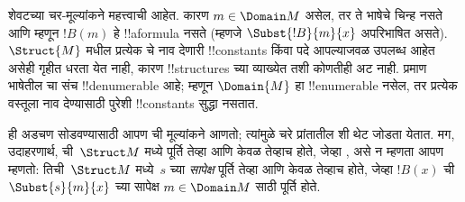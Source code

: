 \documentclass[../../../include/open-logic-section]{subfiles}
\begin{document}
\begin{explain}
शेवटच्या 
चर-मूल्यांकने महत्त्वाची आहेत.
कारण $m \in \Domain M$ असेल, तर ते भाषेचे चिन्ह नसते आणि म्हणून
$!B(m)$ हे !!a{formula} नसते (म्हणजे $\Subst{!B}{m}{x}$ अपरिभाषित
असते).~$\Struct{M}$ मधील प्रत्येक चे नाव देणारी
!!{constant}s किंवा पदे
आपल्याजवळ उपलब्ध आहेत असेही गृहीत धरता येत नाही, कारण !!{structure}s
च्या व्याख्येत तशी कोणतीही अट नाही. प्रमाण भाषेतील चा
संच !!{denumerable} आहे; म्हणून $\Domain{M}$ हा !!{enumerable} नसेल,
तर प्रत्येक वस्तूला नाव देण्यासाठी पुरेशी !!{constant}s सुद्धा नसतात.

ही अडचण सोडवण्यासाठी आपण ची मूल्यांकने आणतो; त्यांमुळे
चरे प्रांतातील शी थेट जोडता येतात. मग, उदाहरणार्थ,
 ची~$\Struct M$
मध्ये पूर्ति तेव्हा आणि केवळ तेव्हाच होते, जेव्हा
, असे न म्हणता आपण म्हणतो:
तिची~$\Struct M$ मध्ये~$s$ च्या \emph{सापेक्ष} पूर्ति तेव्हा आणि केवळ
तेव्हाच होते, जेव्हा $!B(x)$ ची~$\Subst{s}{m}{x}$ च्या सापेक्ष
 $m \in \Domain M$ साठी पूर्ति होते.
%
\end{explain}
\end{document}
